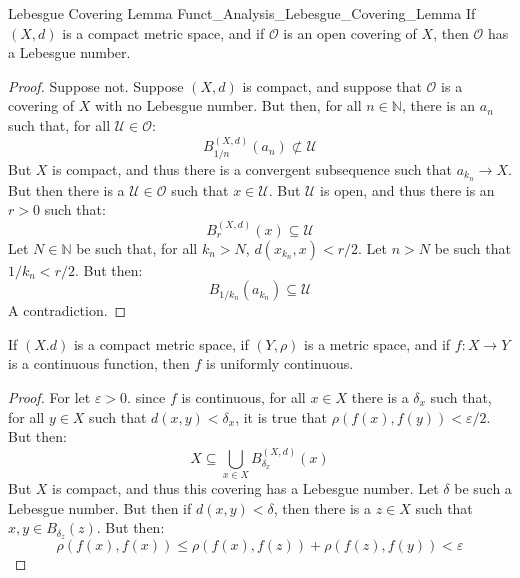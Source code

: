         \begin{ltheorem}{Lebesgue Covering Lemma}
              {Funct_Analysis_Lebesgue_Covering_Lemma}
            If $(X,d)$ is a compact metric space, and if
            $\mathcal{O}$ is an open covering of $X$, then
            $\mathcal{O}$ has a Lebesgue number.
        \end{ltheorem}
        \begin{proof}
            Suppose not. Suppose $(X,d)$ is compact, and suppose
            that $\mathcal{O}$ is a covering of $X$ with no
            Lebesgue number. But then, for all $n\in\mathbb{N}$,
            there is an $a_{n}$ such that, for all
            $\mathcal{U}\in\mathcal{O}$:
            \begin{equation}
                B_{1/n}^{(X,d)}(a_{n})\not\subset\mathcal{U}
            \end{equation}
            But $X$ is compact, and thus there is a convergent
            subsequence such that $a_{k_{n}}\rightarrow{X}$.
            But then there is a $\mathcal{U}\in\mathcal{O}$ such
            that $x\in\mathcal{U}$. But $\mathcal{U}$ is open,
            and thus there is an $r>0$ such that:
            \begin{equation}
                B_{r}^{(X,d)}(x)\subseteq\mathcal{U}
            \end{equation}
            Let $N\in\mathbb{N}$ be such that, for all
            $k_{n}>N$, $d(x_{k_{n}},x)<r/2$. Let
            $n>N$ be such that $1/k_{n}<r/2$. But then:
            \begin{equation}
                B_{1/k_{n}}(a_{k_{n}})\subseteq\mathcal{U}
            \end{equation}
            A contradiction.
        \end{proof}
        \begin{theorem}
            If $(X.d)$ is a compact metric space, if $(Y,\rho)$
            is a metric space, and if $f:X\rightarrow{Y}$ is a
            continuous function, then $f$ is
            uniformly continuous.
        \end{theorem}
        \begin{proof}
            For let $\varepsilon>0$. since $f$ is
            continuous, for all $x\in{X}$ there is a
            $\delta_{x}$ such that, for all $y\in{X}$ such
            that $d(x,y)<\delta_{x}$, it is true that
            $\rho(f(x),f(y))<\varepsilon/2$. But then:
            \begin{equation}
                X\subseteq
                    \bigcup_{x\in{X}}B_{\delta_{x}}^{(X,d)}(x)
            \end{equation}
            But $X$ is compact, and thus this covering has a
            Lebesgue number. Let $\delta$ be such a
            Lebesgue number. But then if $d(x,y)<\delta$,
            then there is a $z\in{X}$ such that
            $x,y\in{B}_{\delta_{z}}(z)$. But then:
            \begin{equation}
                \rho(f(x),f(x))\leq
                \rho(f(x),f(z))+\rho(f(z),f(y))
                <\varepsilon
            \end{equation}
        \end{proof}
